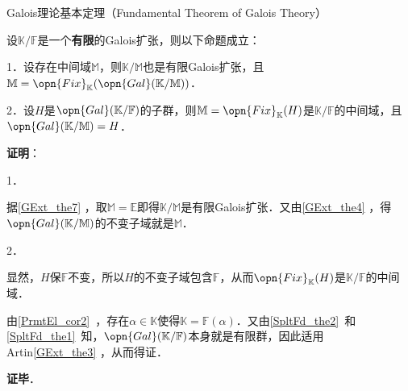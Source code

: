 \begin{theorem}{Galois理论基本定理（Fundamental Theorem of Galois Theory）}\label{GExt_the10}

设$\mathbb{K}/\mathbb{F}$是一个\textbf{有限}的Galois扩张，则以下命题成立：

1．设存在中间域$\mathbb{M}$，则$\mathbb{K}/\mathbb{M}$也是有限Galois扩张，且$\mathbb{M}=\opn{Fix}_\mathbb{K}(\opn{Gal}(\mathbb{K}/\mathbb{M}))$．

2．设$H$是$\opn{Gal}(\mathbb{K}/\mathbb{F})$的子群，则$\mathbb{M}=\opn{Fix}_\mathbb{K}(H)$是$\mathbb{K}/\mathbb{F}$的中间域，且$\opn{Gal}(\mathbb{K}/\mathbb{M})=H$．


\end{theorem}

\textbf{证明}：

1．

据\autoref{GExt_the7} ，取$\mathbb{M}=\mathbb{E}$即得$\mathbb{K}/\mathbb{M}$是有限Galois扩张．又由\autoref{GExt_the4} ，得$\opn{Gal}(\mathbb{K}/\mathbb{M})$的不变子域就是$\mathbb{M}$．

2．

显然，$H$保$\mathbb{F}$不变，所以$H$的不变子域包含$\mathbb{F}$，从而$\opn{Fix}_\mathbb{K}(H)$是$\mathbb{K}/\mathbb{F}$的中间域．

由\autoref{PrmtEl_cor2}~，存在$\alpha\in\mathbb{K}$使得$\mathbb{K}=\mathbb{F}(\alpha)$．又由\autoref{SpltFd_the2}~和\autoref{SpltFd_the1}~知，$\opn{Gal}(\mathbb{K}/\mathbb{F})$本身就是有限群，因此适用Artin\autoref{GExt_the3} ，从而得证．

\textbf{证毕}．


















